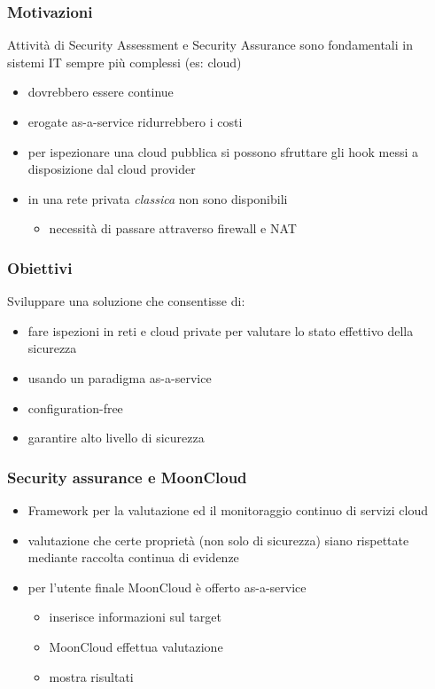 \begin{frame}
    \frametitle{Motivazioni}
    
    Attività di \alert{Security Assessment} e \alert{Security Assurance} sono 
    fondamentali in sistemi IT sempre più \alert{complessi} (es: cloud)
    \begin{itemize}
        \item dovrebbero essere \alert{continue}
        \item erogate \alert{as-a-service} ridurrebbero i costi
    \end{itemize}
			
	\begin{itemize}
		\item per ispezionare una cloud pubblica si possono sfruttare
		      gli \alert{hook} messi a disposizione dal cloud provider
		\item in una rete privata \textit{classica} non sono disponibili
		      		      		      
		      \begin{itemize}
		      	\item necessità di passare attraverso \alert{firewall} e \alert{NAT}
		      \end{itemize}
	\end{itemize}
			
\end{frame}

\begin{frame}
	\frametitle{Obiettivi}
	Sviluppare una soluzione che consentisse di:
	\begin{itemize}
		\item fare \alert{ispezioni} in reti e cloud private per
		      valutare lo \alert{stato effettivo} della sicurezza
		\item usando un paradigma \alert{as-a-service}
		\item \alert{configuration-free}
		\item garantire alto livello di sicurezza
	\end{itemize}
\end{frame}

\begin{frame}
	\frametitle{Security assurance e MoonCloud}
	\begin{itemize}
		\item Framework per la \alert{valutazione}
		      ed il \alert{monitoraggio continuo} di servizi
		      cloud
		\item valutazione che certe proprietà (non solo di sicurezza)
		      siano rispettate
		      mediante \alert{raccolta continua di evidenze}
		\item per l'utente finale MoonCloud è offerto \alert{as-a-service}
		      \begin{itemize}
		      	\item inserisce informazioni sul target
		      	\item MoonCloud effettua valutazione
		      	\item mostra risultati
		      \end{itemize}
	\end{itemize}
\end{frame}

